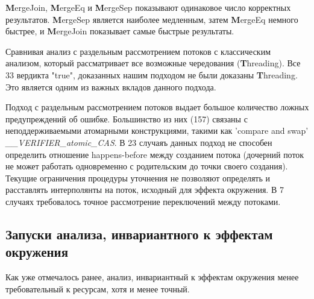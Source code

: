 {\textbf MergeJoin}, {\textbf MergeEq} и {\textbf MergeSep} показывают одинаковое число корректных результатов.
{\textbf MergeSep} является наиболее медленным, затем {\textbf MergeEq} немного быстрее, и {\textbf MergeJoin} показывает самые быстрые результаты.

Сравнивая анализ с раздельным рассмотрением потоков с классическим анализом, который рассматривает все возможные чередования ({\textbf Threading}).
Все 33 вердикта "true", доказанных нашим подходом не были доказаны {\textbf Threading}.
Это является одним из важных вкладов данного подхода.

Подход с раздельным рассмотрением потоков выдает большое количество ложных предупреждений об ошибке. 
Большинство из них (157) связаны с неподдерживаемыми атомарными конструкциями, такими как 'compare and swap' {\em \_\_VERIFIER\_atomic\_CAS}.
В 23 случаяъ данных подход не способен определить отношение happens-before между созданием потока (дочерний поток не может работать одновременно с родительским до точки своего создания).
Текущие ограничения процедуры уточнения не позволяют определять и расставлять интерполянты на поток, исходный для эффекта окружения.
В 7 случаях требовалось точное рассмотрение переключений между потоками.

\subsection{Запуски анализа, инвариантного к эффектам окружения}

Как уже отмечалось ранее, анализ, инвариантный к эффектам окружения менее требовательный к ресурсам, хотя и менее точный.

